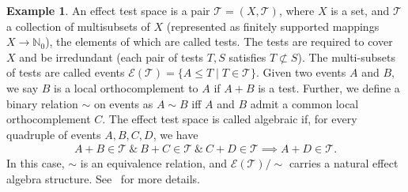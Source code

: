 \documentclass{article}
\theoremstyle{plain}
\theoremstyle{definition}
\newtheorem{example}[theorem]{Example}
\theoremstyle{remark}
\begin{document}
\begin{example}\label{ex:orthomodular}
    An effect test space is a pair $\mathcal{T}=(X,\mathcal{T})$, where $X$ is a set, and $\mathcal{T}$ a collection of multisubsets of $X$ (represented as finitely supported mappings $X\rightarrow \mathbb{N}_0$), the elements of which are called tests.
    The tests are required to cover $X$ and be irredundant (each pair of tests $T,S$ satisfies $T\not\subset S$).
    The multi-subsets of tests are called events $\mathcal{E}(\mathcal{T})=\{A\leq T\mid T\in\mathcal{T}\}$. Given two events $A$ and $B$, we say $B$ is a local orthocomplement to $A$ if $A + B$ is a test. Further, we define a binary relation $\sim$ on events as $A\sim B$ iff $A$ and $B$ admit a common local orthocomplement $C$.
    The effect test space is called algebraic if, for every
quadruple of events $A,B,C,D$, we have \begin{align}\label{eq:algebraicity}
        A +  B\in\mathcal{T}\ \&\ B + C\in\mathcal{T}\ \&\ C + D\in\mathcal{T}\implies A + D\in\mathcal{T}.
    \end{align}
In this case, $\sim$ is an equivalence relation, and
$\mathcal{E}(\mathcal{T})/{\sim}$ carries a natural
effect algebra structure.
See~\cite{Gudder1997EffectTestSpacesAndAlgebras}
for more details.


\end{example}
\end{document}
